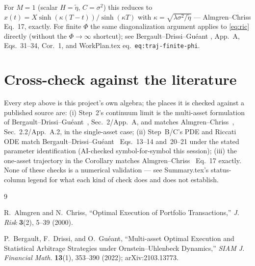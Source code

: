 \documentclass[11pt,a4paper]{article}
\begin{document}
For $M=1$ (scalar $H=\tilde\eta$, $C=\sigma^2$) this reduces to
$x(t)=X\sinh(\kappa(T-t))/\sinh(\kappa T)$ with
$\kappa=\sqrt{\lambda\sigma^2/\tilde\eta}$ --- Almgren--Chriss
\cite{almgrenchriss2000} Eq.~17, exactly. For finite $\Phi$ the same
diagonalization argument applies to \eqref{eq:ric} directly (without the
$\Phi\to\infty$ shortcut); see Bergault--Drissi--Gu\'eant
\cite{bergault2022}, App.~A, Eqs.~31--34, Cor.~1, and WorkPlan.tex
eq.~\texttt{eq:traj-finite-phi}.

\section*{Cross-check against the literature}

Every step above is this project's own algebra; the places it is checked
against a published source are: (i) Step~2's continuum limit is the
multi-asset formulation of Bergault--Drissi--Gu\'eant~\cite{bergault2022},
Sec.~2/App.~A, and matches Almgren--Chriss~\cite{almgrenchriss2000},
Sec.~2.2/App.~A.2, in the single-asset case; (ii) Step~B/C's PDE and Riccati
ODE match Bergault--Drissi--Gu\'eant~\cite{bergault2022} Eqs.~13--14
and~20--21 under the stated parameter identification (AI-checked
symbol-for-symbol this session); (iii) the one-asset trajectory in the
Corollary matches Almgren--Chriss~\cite{almgrenchriss2000} Eq.~17 exactly.
None of these checks is a numerical validation --- see Summary.tex's
status-column legend for what each kind of check does and does not
establish.

\begin{thebibliography}{9}

 R.~Almgren and N.~Chriss, ``Optimal Execution of
Portfolio Transactions,'' \emph{J. Risk} \textbf{3}(2), 5--39 (2000).

 P.~Bergault, F.~Drissi, and O.~Gu\'eant, ``Multi-asset
Optimal Execution and Statistical Arbitrage Strategies under
Ornstein--Uhlenbeck Dynamics,'' \emph{SIAM J. Financial Math.} \textbf{13}(1),
353--390 (2022); arXiv:2103.13773.

\end{thebibliography}
\end{document}
